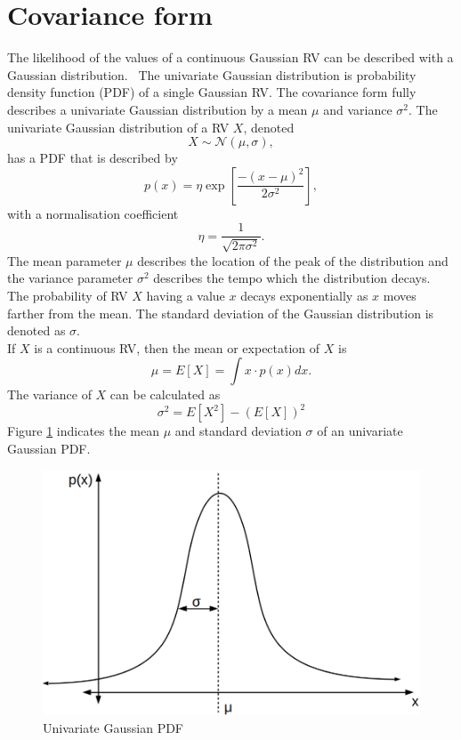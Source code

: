 \documentclass[12pt,oneside,openany,a4paper, %
afrikaans,english,
]{memoir}
\numberwithin{equation}{chapter}
\begin{document}
\section{Covariance form}
The likelihood of the values of a continuous Gaussian RV can be described with a Gaussian distribution. \
The univariate Gaussian distribution is probability density function (PDF) of a single Gaussian RV. The covariance form fully describes a univariate Gaussian distribution by a mean $\mu$ and variance $\sigma^2$.
The univariate Gaussian distribution of a RV $X$, denoted
\begin{equation}
X\sim\mathcal{N}(\mu,\sigma),
\end{equation}
has a PDF that is described by
\begin{equation}\label{eq:1}
p(x) = \eta\exp\left[\frac{-(x-\mu)^2}{2\sigma^2}\right],
\end{equation}
with a normalisation coefficient 
\begin{equation}\label{eq:2}
\eta = \frac{1}{\sqrt{2\pi\sigma^2}}.
\end{equation}
The mean parameter $\mu$ describes the location of the peak of the distribution and the variance parameter $\sigma^2$ describes the tempo which the distribution decays. The probability of RV $X$ having a value $x$ decays exponentially as $x$ moves farther from the mean. The standard deviation of the Gaussian distribution is denoted as $\sigma$.\\
If $X$ is a continuous RV, then the mean or expectation of $X$ is
\begin{equation}
\mu = E\left[ X \right] = \int x \cdot p(x)dx.
\end{equation}
The variance of $X$ can be calculated as
\begin{equation}
\sigma^2 = E[X^2] - (E[X])^2
\end{equation}
 Figure \ref{fig:gPDF1} indicates the mean $\mu$ and standard deviation $\sigma$ of an univariate Gaussian PDF.
\begin{figure}[H]
  \includegraphics[width=0.6\linewidth]{Figures/univariate.png}
  \centering
  \caption{Univariate Gaussian PDF}
  \label{fig:gPDF1}
\end{figure}
\end{document}
